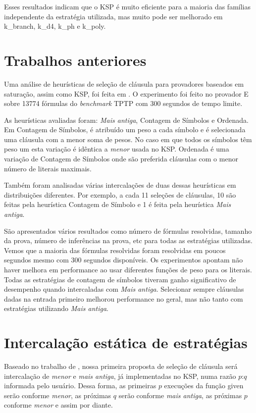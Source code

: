 Esses resultados indicam que o KSP é muito eficiente para a maioria das famílias independente da estratégia utilizada, mas muito pode ser melhorado em k\_branch, k\_d4, k\_ph e k\_poly.

\section{Trabalhos anteriores}
Uma análise de heurísticas de seleção de cláusula para provadores baseados em saturação, assim como KSP, foi feita em \cite{stephan}. O experimento foi feito no provador E sobre 13774 fórmulas do \textit{benchmark} TPTP \cite{TPTP} com 300 segundos de tempo limite.

As heurísticas avaliadas foram: \textit{Mais antiga}, Contagem de Símbolos e Ordenada.%
 Em Contagem de Símbolos, é atribuído um peso a cada símbolo e é selecionada uma cláusula com a menor soma de pesos. No caso em que todos os símbolos têm peso um esta variação é idêntica a \textit{menor} usada no KSP. Ordenada é uma variação de Contagem de Símbolos onde são preferida cláusulas com o menor número de literais maximais.

Também foram analisadas várias intercalações de duas dessas heurísticas em distribuições diferentes. Por exemplo, a cada 11 seleções de cláusulas, 10 são feitas pela heurística Contagem de Símbolo e 1 é feita pela heurística \textit{Mais antiga}.

São apresentados vários resultados como número de fórmulas resolvidas, tamanho da prova, número de inferências na prova, etc para todas as estratégias utilizadas. Vemos que a maioria das fórmulas resolvidas foram resolvidas em poucos segundos mesmo com 300 segundos disponíveis. Os experimentos apontam não haver melhora em performance ao usar diferentes funções de peso para os literais. Todas as estratégias de contagem de símbolos tiveram ganho significativo de desempenho quando intercaladas com \textit{Mais antiga}. Selecionar sempre cláusulas dadas na entrada primeiro melhorou performance no geral, mas não tanto com estratégias utilizando \textit{Mais antiga}.

\section{Intercalação estática de estratégias} \label{secao:1proposta}
Baseado no trabalho de \cite{stephan}, nossa primeira proposta de seleção de cláusula será intercalação de \textit{menor} e \textit{mais antiga}, já implementadas no KSP, numa razão $p$:$q$ informada pelo usuário. Dessa forma, as primeiras $p$ execuções da função {\sf given} serão conforme \textit{menor}, as próximas $q$ serão conforme \textit{mais antiga}, as próximas $p$ conforme \textit{menor} e assim por diante.

